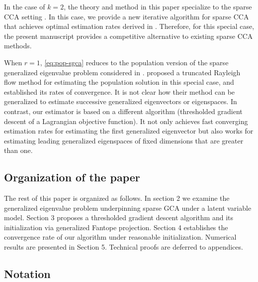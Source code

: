 \documentclass[11pt]{article}
\newcommand{\nb}[1]{\textcolor{orange}{\texttt{[#1]}}}
\newcommand{\gsc}[1]{\textcolor{blue}{\texttt{[#1]}}}
\newcommand{\0}{{\mathbf{0}}}
\begin{document}
In the case of $k = 2$, the theory and method in this paper specialize to the sparse CCA setting \citep{chen2013sparse,gao2015minimax,gao2017sparse}. 
In this case, 
we provide
a new iterative algorithm for sparse CCA that achieves optimal estimation rates derived in \citet{gao2015minimax}.
Therefore, for this special case, the present manuscript provides a competitive alternative to existing sparse CCA methods.


When $r=1$, \eqref{eq:pop-sgca} reduces to the population version of the sparse generalized eigenvalue problem considered in \citet{tan2018sparse}.
\citet{tan2018sparse} proposed a truncated Rayleigh flow method for estimating the population solution in this special case, and established its rates of convergence.
It is not clear how their method can be generalized to estimate successive generalized eigenvectors or eigenspaces.
In contrast, our estimator is based on a different algorithm (thresholded gradient descent of a Lagrangian objective function).
It not only achieves fast converging estimation rates for estimating the first generalized eigenvector but also works for estimating leading generalized eigenspaces of fixed dimensions that are greater than one.


\subsection{Organization of the paper}

The rest of this paper is organized as follows. 
In section 2 we examine the generalized eigenvalue problem underpinning sparse GCA under a latent variable model.
Section 3 proposes a thresholded gradient descent algorithm and its initialization via generalized Fantope projection. 
Section 4 establishes the convergence rate of our algorithm under reasonable initialization. 
Numerical results are presented in Section 5. 
Technical proofs are deferred to appendices.
\iffalse
Section 6 concludes the paper and points some further directions.
\nb{shall we remove section 6?}\gsc{I think it is fair to remove Section 6}
Implementation details, additional proofs and technical details can be found in the appendices. 
\fi

\subsection{Notation}
\label{sec:notation}
\end{document}
